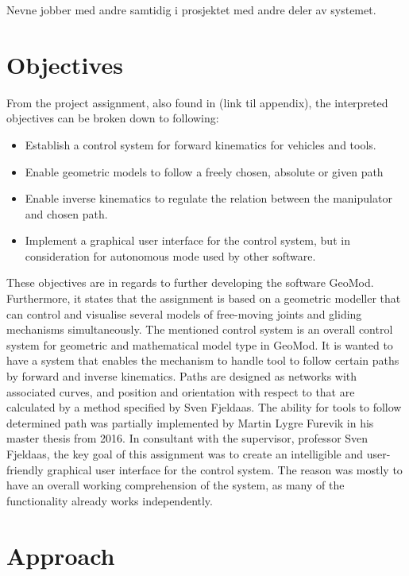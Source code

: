 Nevne jobber med andre samtidig i prosjektet med andre deler av systemet.

\section{Objectives}

From the project assignment, also found in (link til appendix), the interpreted objectives can be broken down to following:

\begin{itemize}
  \item Establish a control system for forward kinematics for vehicles and tools.
  \item Enable geometric models to follow a freely chosen, absolute or given path
  \item Enable inverse kinematics to regulate the relation between the manipulator and chosen path.  
  \item Implement a graphical user interface for the control system, but in consideration for autonomous mode used by other software.
\end{itemize}


These objectives are in regards to further developing the software GeoMod. Furthermore, it states that the assignment is based on a geometric modeller that can control and visualise several models of free-moving joints and gliding mechanisms simultaneously.  The mentioned control system is an overall control system for geometric and mathematical model type in GeoMod. It is wanted to have a system that enables the mechanism to handle tool to follow certain paths by forward and inverse kinematics. Paths are designed as networks with associated curves, and position and orientation with respect to that are calculated by a method specified by Sven Fjeldaas. 
The ability for tools to follow determined path was partially implemented by Martin Lygre Furevik in his master thesis from 2016. In consultant with the supervisor, professor Sven Fjeldaas,  the key goal of this assignment was to create an intelligible and user-friendly graphical user interface for the control system. The reason was mostly to have an overall working comprehension of the system, as many of the functionality already works independently.



\section{Approach}

